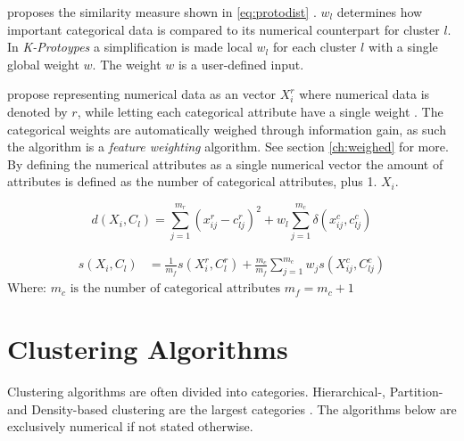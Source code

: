 \documentclass[../report.tex]{subfiles}
\begin{document}
\citeauthor{Huang97clusteringlarge} proposes the similarity measure shown in \ref{eq:protodist} \cite{Huang97clusteringlarge}. $w_l$ determines how important categorical data is compared to its numerical counterpart for cluster $l$. In \textit{K-Protoypes} a simplification is made local $w_l$ for each cluster $l$ with a single global weight $w$. The weight $w$ is a user-defined input.

\citeauthor{Cheung2013} \cite{Cheung2013} propose representing numerical data as an vector $X_{i}^{r}$ where numerical data is denoted by $r$, while letting each categorical attribute have a single weight . The categorical weights are automatically weighed through information gain, as such the algorithm is a \textit{feature weighting} algorithm. See section \ref{ch:weighed} for more. By defining the numerical attributes as a single numerical vector the amount of attributes is defined as the number of categorical attributes, plus 1. $X_{i}$.

\begin{equation}
\label{eq:protodist}
d(X_i, C_l) = \sum_{j=1}^{m_r}( x_{ij}^{r} - c_{lj}^{r} )^2 +
  w_l \sum_{j=1}^{m_c}\delta( x_{ij}^c, c_{lj}^c )
\end{equation}

\begin{align}
\label{eq:mixJia}
s(X_{i},C_{l}) &= \frac{1}{m_f}s(X_{i}^r,C_{l}^r) + \frac{m_c}{m_f}\sum_{j = 1}^{m_c}{{w_j}s(X_{ij}^c,C_{lj}^c)}
\end{align}
Where:\newline
$m_c \text{ is the number of categorical attributes}$ \newline
$m_f = m_c + 1$




\section{Clustering Algorithms}
Clustering algorithms are often divided into categories. Hierarchical-, Partition- and Density-based clustering are the largest categories \cite{Xu2015}. The algorithms below are exclusively numerical if not stated otherwise.
\end{document}
